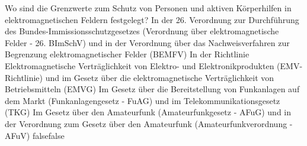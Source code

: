     {Wo sind die Grenzwerte zum Schutz von Personen und aktiven Körperhilfen in elektromagnetischen Feldern festgelegt?}
    {In der 26. Verordnung zur Durchführung des Bundes-Immissionsschutzgesetzes (Verordnung über elektromagnetische Felder - 26. BImSchV) und in der Verordnung über das Nachweisverfahren zur Begrenzung elektromagnetischer Felder (BEMFV)}
    {In der Richtlinie Elektromagnetische Verträglichkeit von Elektro- und Elektronikprodukten (EMV-Richtlinie) und im Gesetz über die elektromagnetische Verträglichkeit von Betriebsmitteln (EMVG)}
    {Im Gesetz über die Bereitstellung von Funkanlagen auf dem Markt (Funkanlagengesetz - FuAG) und im Telekommunikationsgesetz (TKG)}
    {Im Gesetz über den Amateurfunk (Amateurfunkgesetz - AFuG) und in der Verordnung zum Gesetz über den Amateurfunk (Amateurfunkverordnung - AFuV)}
    {false}{false}